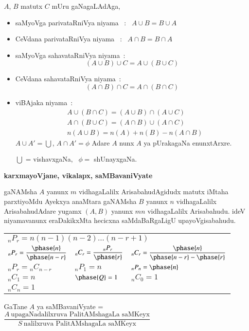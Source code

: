 \noindent
$A$, $B$ matutx $C$ mUru gaNagaLAdAga,
\begin{itemize}
\item[\eng{(i)}] saMyoVga parivataRniVya niyama \ : \ $A\cup B = B \cup A$

\item[\eng{(ii)}] CeVdana parivataRniVya niyama \ : \ $A\cap B = B\cap A$

\item[\eng{(iii)}] saMyoVga sahavataRniVya niyama~:
$$
(A\cup B)\cup C=A\cup (B\cup C)
$$

\item[\eng{(iv)}] CeVdana sahavataRniVya niyama~:
$$
(A\cap B)\cap C=A\cap (B\cap C)
$$

\item[\eng{(v)}] viBAjaka niyama~:
\begin{align*}
& A\cup (B\cap C)=(A\cup B)\cap (A\cup C)\\[2pt]
& A\cap (B\cup C)=(A\cap B)\cup (A\cap C)\\[2pt]
& n(A\cup B)=n(A)+n(B)-n(A\cap B)
\end{align*}
$A\cup A'=\bigcup$, $A\cap A'=\phi$ Adare $A$ nunx $A$ ya pUrakagaNa enunxtArxre.

$\bigcup$ = vishavxgaNa, \ $\phi=$ shUnayxgaNa.
\end{itemize}

\begin{center}
{\large\bf karxmayoVjane, vikalapx, saMBavaniVyate}
\smallskip

{\large\bf {}}
\end{center}

gaNAMsha $A$ yanunx $m$ vidhagaLalilx ArisabahudAgidudx matutx iMtaha parxtiyoMdu Ayekxya anaMtara gaNAMsha $B$ yanunx $n$ vidhagaLalilx ArisabahudAdare yugamx $(A,B)$ yanunx $mn$ vidhagaLalilx Arisabahudu. ideV niyamavanunx eraDakikxMta hecicxna saMdaBaRgaLigU upayoVgisabahudu.
\begin{center}
\renewcommand{\arraystretch}{1.4}
\begin{tabular}{l@{\qquad}l@{\qquad}l}
\multicolumn{3}{l}{${}_{n}P_{r} = n(n-1)(n-2)\ldots (n-r+1)$}\\
$_{n}P_{r}=\dfrac{\phase{n}}{\phase{n-r}}$ & $_{n}C_{r}=\dfrac{_{n}P_{r}}{\phase{r}}$ & $_{n}C_{r}=\dfrac{\phase{n}}{\phase{n-r}-\phase{r}}$\\
$_{n}P_{r}={}_{n}C_{n-r}$ & $_{n}P_{1}=n$ & ${}_{n}P_{n}=\phase{n}$\\
$_{n}C_{1}=n$ & $\phase{Q}=1$ & ${}_{n}C_{0}=1$\\
$_{n}C_{n}=1$ & &
\end{tabular}
\end{center}
GaTane $A$ ya saMBavaniVyate = $\dfrac{A~\text{upagaNadalilxruva PalitAMshagaLa saMKeyx}}{S~\text{nalilxruva PalitAMshagaLa saMKeyx}}$
\smallskip

